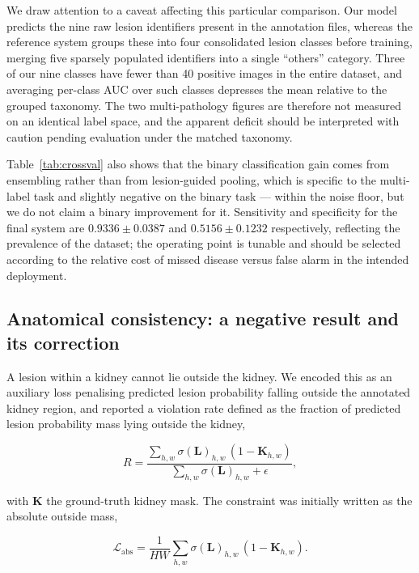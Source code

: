 \documentclass[pdflatex,sn-mathphys-num]{sn-jnl}
\theoremstyle{thmstyleone}%
\theoremstyle{thmstyletwo}%
\theoremstyle{thmstylethree}%
\begin{document}
We draw attention to a caveat affecting this particular comparison. Our model predicts the nine
raw lesion identifiers present in the annotation files, whereas the reference system groups
these into four consolidated lesion classes before training, merging five sparsely populated
identifiers into a single ``others'' category. Three of our nine classes have fewer than 40
positive images in the entire dataset, and averaging per-class AUC over such classes depresses
the mean relative to the grouped taxonomy. The two multi-pathology figures are therefore not
measured on an identical label space, and the apparent deficit should be interpreted with
caution pending evaluation under the matched taxonomy.

Table~\ref{tab:crossval} also shows that the binary classification gain comes from ensembling
rather than from lesion-guided pooling, which is specific to the multi-label task and slightly
negative on the binary task --- within the noise floor, but we do not claim a binary improvement
for it. Sensitivity and specificity for the final system are $0.9336 \pm 0.0387$ and $0.5156
\pm 0.1232$ respectively, reflecting the prevalence of the dataset; the operating point is
tunable and should be selected according to the relative cost of missed disease versus false
alarm in the intended deployment.

\subsection{Anatomical consistency: a negative result and its correction}\label{subsec:consistency}

A lesion within a kidney cannot lie outside the kidney. We encoded this as an auxiliary loss
penalising predicted lesion probability falling outside the annotated kidney region, and
reported a violation rate defined as the fraction of predicted lesion probability mass lying
outside the kidney,

\begin{equation}
R = \frac{\sum_{h,w} \sigma(\mathbf{L})_{h,w}\,(1 - \mathbf{K}_{h,w})}
         {\sum_{h,w} \sigma(\mathbf{L})_{h,w} + \epsilon},
\label{eq:violation}
\end{equation}

with $\mathbf{K}$ the ground-truth kidney mask. The constraint was initially written as the
absolute outside mass,

\begin{equation}
\mathcal{L}_{\text{abs}} = \frac{1}{HW}\sum_{h,w}
      \sigma(\mathbf{L})_{h,w}\,(1 - \mathbf{K}_{h,w}).
\label{eq:consabs}
\end{equation}
\end{document}
